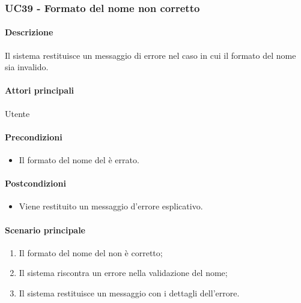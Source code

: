 \subsubsection{UC39 - Formato del nome non corretto}\label{UC39}
\paragraph*{Descrizione}
Il sistema restituisce un messaggio di errore nel caso in cui il formato del nome sia invalido.

\paragraph*{Attori principali}
Utente

\paragraph*{Precondizioni}
\begin{itemize}
  \item Il formato del nome del  è errato.
\end{itemize}

\paragraph*{Postcondizioni}
\begin{itemize}
  \item Viene restituito un messaggio d'errore esplicativo.
\end{itemize}

\paragraph*{Scenario principale}
\begin{enumerate}
  \item Il formato del nome del  non è corretto;
  \item Il sistema riscontra un errore nella validazione del nome;
  \item Il sistema restituisce un messaggio con i dettagli dell'errore.  
\end{enumerate}